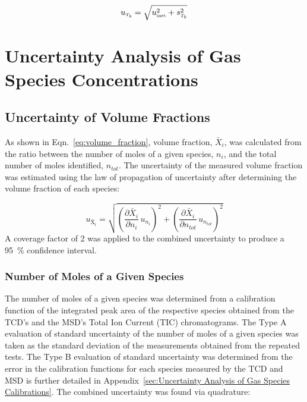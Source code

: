 \documentclass[12pt]{article}
\begin{document}
\begin{equation}
\label{eq:temp_uncertainty}
u_{\scriptscriptstyle T_{b}} = \sqrt{ u_{\rm \scriptscriptstyle inst}^2 + s_{\scriptscriptstyle T_{b}}^2}
\end{equation}
\pagebreak

\section{Uncertainty Analysis of Gas Species Concentrations} \label{sec:UncertaintyGasSpecies}

\subsection{Uncertainty of Volume Fractions} \label{sec:UncertaintyMoleFrac}
As shown in Eqn.~\ref{eq:volume_fraction}, volume fraction, $\bar{X}_{i}$, was calculated from the ratio between the number of moles of a given species, $n_{i}$, and the total number of moles identified, $n_{tot}$. The uncertainty of the measured volume fraction was estimated using the law of propagation of uncertainty after determining the volume fraction of each species:

\begin{equation}
\label{eq:Volume_Frac_Uncertainty}
u_\mathrm{\bar{X}_{i}} = \sqrt{{\left( \frac{\partial \bar{X}_{i}}{\partial n_{i}}\,u_{\scriptscriptstyle n_{i}} \right)}^2+{\left(\frac{\partial \bar{X}_{i}}{\partial n_{tot}}\,u_{\scriptscriptstyle n_{tot}}\right)}^2}
\end{equation}
A coverage factor of 2 was applied to the combined uncertainty to produce a 95~\% confidence interval.

\subsubsection{Number of Moles of a Given Species}
\label{ssec:Number_of_Moles_of_a_Given_Species}

The number of moles of a given species was determined from a calibration function of the integrated peak area of the respective species obtained from the TCD's and the MSD's Total Ion Current (TIC) chromatograms. The Type A evaluation of standard uncertainty of the number of moles of a given species was taken as the standard deviation of the measurements obtained from the repeated tests. The Type B evaluation of standard uncertainty was determined from the error in the calibration functions for each species measured by the TCD and MSD is further detailed in Appendix~\ref{sec:Uncertainty Analysis of Gas Species Calibrations}. The combined uncertainty was found via quadrature:
\end{document}
